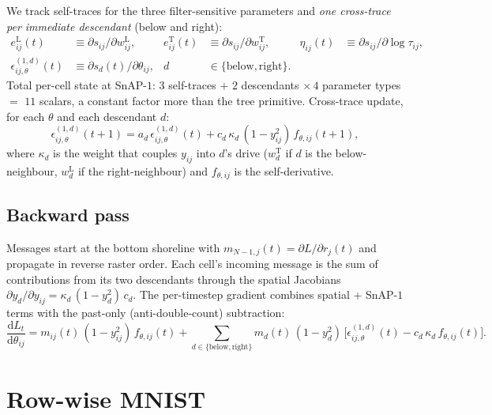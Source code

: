 \documentclass[11pt]{article}
\begin{document}
We track self-traces for the three filter-sensitive parameters and
\emph{one cross-trace per immediate descendant} (below and right):
\begin{align}
e^{\text{L}}_{ij}(t) &\equiv \partial s_{ij}/\partial w^{\text{L}}_{ij}, &
e^{\text{T}}_{ij}(t) &\equiv \partial s_{ij}/\partial w^{\text{T}}_{ij}, &
\eta_{ij}(t) &\equiv \partial s_{ij}/\partial \log\tau_{ij}, \\
\epsilon^{(1,d)}_{ij,\theta}(t) &\equiv \partial s_d(t)/\partial \theta_{ij}, &
d &\in \{\text{below}, \text{right}\}. & &
\end{align}
Total per-cell state at SnAP-$1$: $3$ self-traces $+$ $2$ descendants
$\times\,4$ parameter types $=$ $11$ scalars, a constant factor more
than the tree primitive. Cross-trace update, for each $\theta$ and each
descendant $d$:
\begin{equation}
\epsilon^{(1,d)}_{ij,\theta}(t{+}1) =
a_d\,\epsilon^{(1,d)}_{ij,\theta}(t)
+ c_d\,\kappa_d\,(1 - y_{ij}^2)\,f_{\theta,ij}(t{+}1),
\end{equation}
where $\kappa_d$ is the weight that couples $y_{ij}$ into $d$'s drive
($w^\text{T}_d$ if $d$ is the below-neighbour, $w^\text{L}_d$ if the
right-neighbour) and $f_{\theta,ij}$ is the self-derivative.

\subsection{Backward pass}

Messages start at the bottom shoreline with
$m_{N{-}1,j}(t) = \partial L/\partial r_j(t)$ and propagate in reverse
raster order. Each cell's incoming message is the sum of contributions
from its two descendants through the spatial Jacobians
$\partial y_d/\partial y_{ij} = \kappa_d\,(1{-}y_d^2)\,c_d$. The
per-timestep gradient combines spatial + SnAP-$1$ terms with the
past-only (anti-double-count) subtraction:
\begin{equation}
\frac{\mathrm{d}L_t}{\mathrm{d}\theta_{ij}}
= m_{ij}(t)\,(1{-}y_{ij}^2)\,f_{\theta,ij}(t)
+ \!\!\sum_{d\in\{\text{below},\text{right}\}}\!\!
m_d(t)\,(1{-}y_d^2)\,\big[\epsilon^{(1,d)}_{ij,\theta}(t)
- c_d\,\kappa_d\,f_{\theta,ij}(t)\big].
\label{eq:local-grad}
\end{equation}

\section{Row-wise MNIST}
\label{sec:mnist}
\end{document}
